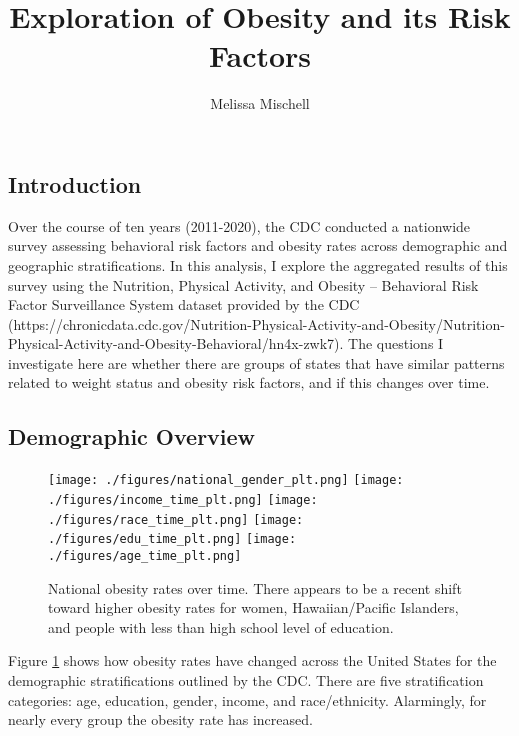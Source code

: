 \documentclass[11pt]{article}
\title{Exploration of Obesity and its Risk Factors}
\author{Melissa Mischell}
\begin{document}
\maketitle

\subsection{Introduction}
Over the course of ten years (2011-2020), the CDC conducted a nationwide survey assessing behavioral risk factors and obesity rates across demographic and geographic stratifications. In this analysis, I explore the aggregated results of this survey using the Nutrition, Physical Activity, and Obesity – Behavioral Risk Factor Surveillance System dataset provided by the CDC (https://chronicdata.cdc.gov/Nutrition-Physical-Activity-and-Obesity/Nutrition-Physical-Activity-and-Obesity-Behavioral/hn4x-zwk7). The questions I investigate here are whether there are groups of states that have similar patterns related to weight status and obesity risk factors, and if this changes over time. 

\subsection{Demographic Overview}

\begin{figure}[hp]
\texttt{[image: ./figures/national\_gender\_plt.png]}
\texttt{[image: ./figures/income\_time\_plt.png]}
\texttt{[image: ./figures/race\_time\_plt.png]}
\texttt{[image: ./figures/edu\_time\_plt.png]}
\texttt{[image: ./figures/age\_time\_plt.png]}
\caption{National obesity rates over time. There appears to be a recent shift toward higher obesity rates for women, Hawaiian/Pacific Islanders, and people with less than high school level of education. 
}
\label{fig:dems_by_time}
\end{figure}

Figure \ref{fig:dems_by_time} shows how obesity rates have changed across the United States for the demographic stratifications outlined by the CDC. There are five stratification categories: age, education, gender, income, and race/ethnicity. Alarmingly, for nearly every group the obesity rate has increased. 
\end{document}
